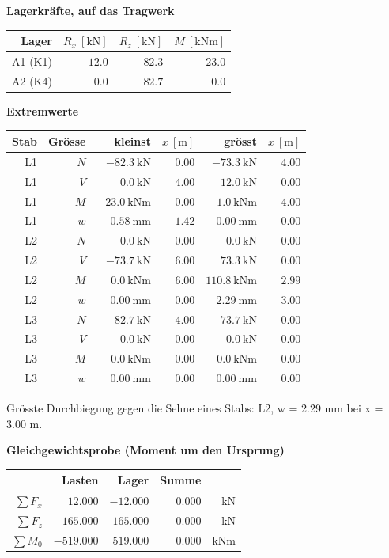 \documentclass[11pt,a4paper]{article}
\begin{document}
\noindent\textbf{Lagerkräfte, auf das Tragwerk}
\begin{longtable}{rrrr}
\hline
Lager & $R_x\ [\mathrm{kN}]$ & $R_z\ [\mathrm{kN}]$ & $M\ [\mathrm{kNm}]$ \\
\hline
\endhead
A1 (K1) & $-12.0$ & $82.3$ & $23.0$ \\
A2 (K4) & $0.0$ & $82.7$ & $0.0$ \\
\hline
\end{longtable}
\noindent\textbf{Extremwerte}
\begin{longtable}{rrrrrr}
\hline
Stab & Grösse & kleinst & $x\ [\mathrm{m}]$ & grösst & $x\ [\mathrm{m}]$ \\
\hline
\endhead
L1 & $N$ & $-82.3\ \mathrm{kN}$ & $0.00$ & $-73.3\ \mathrm{kN}$ & $4.00$ \\
L1 & $V$ & $0.0\ \mathrm{kN}$ & $4.00$ & $12.0\ \mathrm{kN}$ & $0.00$ \\
L1 & $M$ & $-23.0\ \mathrm{kNm}$ & $0.00$ & $1.0\ \mathrm{kNm}$ & $4.00$ \\
L1 & $w$ & $-0.58\ \mathrm{mm}$ & $1.42$ & $0.00\ \mathrm{mm}$ & $0.00$ \\
L2 & $N$ & $0.0\ \mathrm{kN}$ & $0.00$ & $0.0\ \mathrm{kN}$ & $0.00$ \\
L2 & $V$ & $-73.7\ \mathrm{kN}$ & $6.00$ & $73.3\ \mathrm{kN}$ & $0.00$ \\
L2 & $M$ & $0.0\ \mathrm{kNm}$ & $6.00$ & $110.8\ \mathrm{kNm}$ & $2.99$ \\
L2 & $w$ & $0.00\ \mathrm{mm}$ & $0.00$ & $2.29\ \mathrm{mm}$ & $3.00$ \\
L3 & $N$ & $-82.7\ \mathrm{kN}$ & $4.00$ & $-73.7\ \mathrm{kN}$ & $0.00$ \\
L3 & $V$ & $0.0\ \mathrm{kN}$ & $0.00$ & $0.0\ \mathrm{kN}$ & $0.00$ \\
L3 & $M$ & $0.0\ \mathrm{kNm}$ & $0.00$ & $0.0\ \mathrm{kNm}$ & $0.00$ \\
L3 & $w$ & $0.00\ \mathrm{mm}$ & $0.00$ & $0.00\ \mathrm{mm}$ & $0.00$ \\
\hline
\end{longtable}
Grösste Durchbiegung gegen die Sehne eines Stabs: L2, w = 2.29 mm bei x = 3.00 m.

\noindent\textbf{Gleichgewichtsprobe (Moment um den Ursprung)}
\begin{longtable}{rrrrr}
\hline
 & Lasten & Lager & Summe &  \\
\hline
\endhead
$\sum F_x$ & $12.000$ & $-12.000$ & $0.000$ & kN \\
$\sum F_z$ & $-165.000$ & $165.000$ & $0.000$ & kN \\
$\sum M_0$ & $-519.000$ & $519.000$ & $0.000$ & kNm \\
\hline
\end{longtable}
\end{document}
